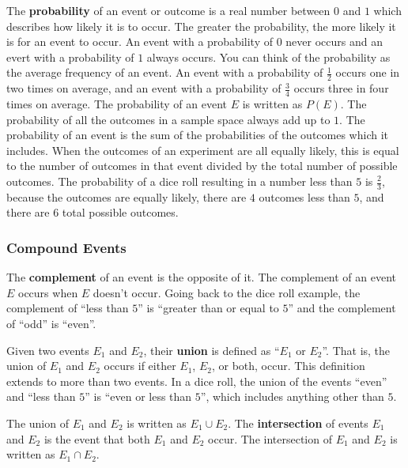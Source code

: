 \documentclass[twocolumn]{article}
\begin{document}
	The \textbf{probability} of an event or outcome is a real number between $0$
	and $1$ which describes how likely it is to occur. The greater the
	probability, the more likely it is for an event to occur. An event with a
	probability of $0$ never occurs and an evert with a probability of $1$
	always occurs. You can think of the probability as the average frequency of
	an event. An event with a probability of $\frac{1}{2}$ occurs one in two
	times on average, and an event with a probability of $\frac{3}{4}$ occurs
	three in four times on average. The probability of an event $E$ is written
	as $P(E)$. The probability of all the outcomes in a sample space always add
	up to $1$. The probability of an event is the sum of the probabilities of
	the outcomes which it includes. When the outcomes of an experiment are all
	equally likely, this is equal to the number of outcomes in that event
	divided by the total number of possible outcomes. The probability of a dice
	roll resulting in a number less than $5$ is $\frac{2}{3}$, because the
	outcomes are equally likely, there are $4$ outcomes less than $5$, and there
	are $6$ total possible outcomes.

	\subsubsection*{Compound Events}
	The \textbf{complement} of an event is the opposite of it. The complement of
	an event $E$ occurs when $E$ doesn't occur. Going back to the dice roll
	example, the complement of ``less than $5$'' is ``greater than or equal to
	$5$'' and the complement of ``odd'' is ``even''.

	Given two events $E_1$ and $E_2$, their \textbf{union} is defined as ``$E_1$
	or $E_2$''. That is, the union of $E_1$ and $E_2$ occurs if either $E_1$,
	$E_2$, or both, occur. This definition extends to more than two events.  In
	a dice roll, the union of the events ``even'' and ``less than $5$'' is
	``even or less than $5$'', which includes anything other than $5$.

	The union of $E_1$ and $E_2$ is written as $E_1 \cup E_2$. The
	\textbf{intersection} of events $E_1$ and $E_2$ is the event that both $E_1$
	and $E_2$ occur. The intersection of $E_1$ and $E_2$ is written as $E_1 \cap
	E_2$.
\end{document}
